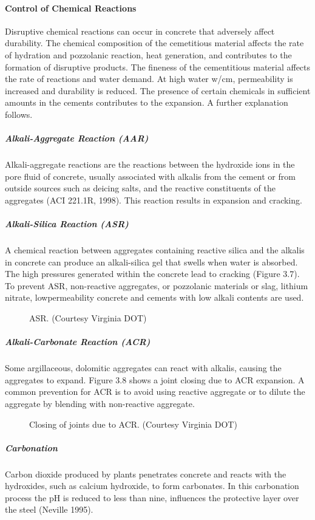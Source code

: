 \paragraph{Control of Chemical Reactions}
Disruptive chemical reactions can occur in concrete that adversely affect durability. The chemical composition of
the cemetitious material affects the rate of hydration and pozzolanic reaction, heat generation, and contributes to the
formation of disruptive products. The fineness of the cementitious material affects the rate of reactions and water
demand. At high water w/cm, permeability is increased and durability is reduced. The presence of certain chemicals
in sufficient amounts in the cements contributes to the expansion. A further explanation follows.

\subparagraph{Alkali-Aggregate Reaction (AAR)}
Alkali-aggregate reactions are the reactions between the hydroxide ions in the pore fluid of concrete, usually
associated with alkalis from the cement or from outside sources such as deicing salts, and the reactive constituents of
the aggregates (ACI 221.1R, 1998). This reaction results in expansion and cracking.
\subparagraph{Alkali-Silica Reaction (ASR)}
A chemical reaction between aggregates containing reactive silica and the alkalis in concrete can produce an
alkali-silica gel that swells when water is absorbed. The high pressures generated within the concrete lead to
cracking (Figure 3.7). To prevent ASR, non-reactive aggregates, or pozzolanic materials or slag, lithium nitrate, lowpermeability
concrete and cements with low alkali contents are used.

\begin{figure}
  \caption{ASR. (Courtesy Virginia DOT)}\label{fig:asr}
\end{figure}

\subparagraph{Alkali-Carbonate Reaction (ACR)}
Some argillaceous, dolomitic aggregates can react with alkalis, causing the aggregates to expand. Figure 3.8
shows a joint closing due to ACR expansion. A common prevention for ACR is to avoid using reactive aggregate or
to dilute the aggregate by blending with non-reactive aggregate.

\begin{figure}
  \caption{Closing of joints due to ACR. (Courtesy Virginia DOT)}\label{fig:acr}
\end{figure}

\subparagraph{Carbonation}
Carbon dioxide produced by plants penetrates concrete and reacts with the hydroxides, such as calcium
hydroxide, to form carbonates. In this carbonation process the pH is reduced to less than nine, influences the
protective layer over the steel (Neville 1995).

